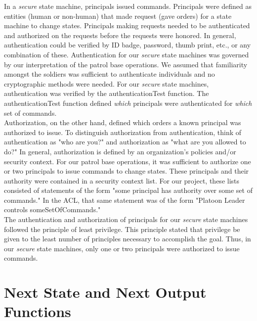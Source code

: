  In a \textit{secure} state machine, principals issued commands.  Principals were
  defined as entities (human or non-human) that made request (gave orders) for a state
  machine to change states.  Principals making requests needed to be authenticated and
  authorized on the requests before the requests were honored.  In general, authentication
  could be verified by ID badge, password, thumb print, etc., or any combination of these.
  Authentication for our \textit{secure} state machines was governed by our interpretation
  of the patrol base operations.  We assumed that familiarity amongst the soldiers was
  sufficient to authenticate individuals and no cryptographic methods were needed.  For
  our \textit{secure} state machines, authentication was verified by the authenticationTest
  function. The authenticationTest function defined \textit{which} principals were
  authenticated for \textit{which} set of commands.\\
  
 Authorization, on the other hand, defined which orders a known principal
  was authorized to issue.  To distinguish authorization from authentication,
  think of authentication as "who are you?" and authorization as "what are you
  allowed to do?"  In general, authorization is defined by an organization's policies
  and/or security context. For our patrol base operations, it was sufficient to
  authorize one or two principals to issue commands to change states.  These principals
  and their authority were contained in a security context list.  For our project,
  these lists consisted of statements of the form "some principal has authority
  over some set of commands."  In the ACL, that same statement was of the form
  "Platoon Leader controls someSetOfCommands." \\
  
 The authentication and authorization of principals for our \textit{secure}
  state machines followed the principle of least privilege.  This principle stated
  that privilege be given to the least number of principles necessary to accomplish
  the goal.   Thus, in our \textit{secure} state machines, only one or two principals
  were authorized to issue commands.  



\section{Next State and Next Output Functions}
\label{sec:next-state-next}



